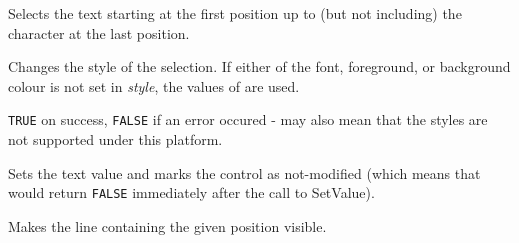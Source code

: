 Selects the text starting at the first position up to (but not including) the character at the last position.




\label{wxtextctrlsetstyle}


Changes the style of the selection. If either of the font, foreground, or
background colour is not set in {\it style}, the values of\rtfsp
{} are used.






{\tt TRUE} on success, {\tt FALSE} if an error occured - may also mean that
the styles are not supported under this platform.

\label{wxtextctrlsetvalue}


Sets the text value and marks the control as not-modified (which means that 
 would return {\tt FALSE} immediately
after the call to SetValue).



\label{wxtextctrlshowposition}


Makes the line containing the given position visible.



\label{wxtextctrlundo}

